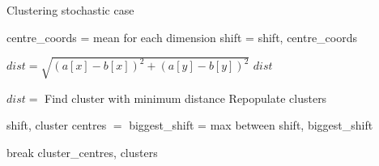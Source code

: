 \begin{algorithm}
\label{alg:KMeans}
\caption{Clustering stochastic case}
 \begin{algorithmic}[1]
    \Statex
    
    
    	\Statex
    		\State centre\_coords =  mean for each dimension
    		\State shift = 
    		\State \Return shift, centre\_coords
    	\EndFunction
    
    	\Statex
    		\State $dist = \sqrt{(a[x] - b[x])^2+(a[y] - b[y])^2}$
    		\State \Return $dist$
    	\EndFunction
      
      	\Statex
      				\State $dist = $
      			\EndFor
      			\State Find cluster with minimum distance
      			\State Repopulate clusters
      		\EndFor
      		
      			\State shift, cluster centres $=$ 
      			\State biggest\_shift =  max between shift, biggest\_shift
      			
      		\EndFor
      			\State break
      		\EndIf
      	\EndWhile
      \State \Return cluster\_centres, clusters
    \EndFunction

  \end{algorithmic}
\end{algorithm}

\clearpage